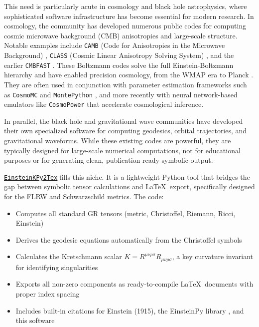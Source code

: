 \documentclass[11pt,a4paper]{article}
\begin{document}
This need is particularly acute in cosmology and black hole astrophysics, where sophisticated software infrastructure has become essential for modern research. In cosmology, the community has developed numerous public codes for computing cosmic microwave background (CMB) anisotropies and large-scale structure. Notable examples include \texttt{CAMB} (Code for Anisotropies in the Microwave Background) \cite{Lewis2000}, \texttt{CLASS} (Cosmic Linear Anisotropy Solving System) \cite{Blas2011, Lesgourgues2011a, Lesgourgues2011b}, and the earlier \texttt{CMBFAST} \cite{Seljak1996}. These Boltzmann codes solve the full Einstein-Boltzmann hierarchy and have enabled precision cosmology, from the WMAP era to Planck \cite{Planck2018}. They are often used in conjunction with parameter estimation frameworks such as \texttt{CosmoMC} \cite{Lewis2002} and \texttt{MontePython} \cite{Audren2013}, and more recently with neural network-based emulators like \texttt{CosmoPower} \cite{SpurioMancini2021} that accelerate cosmological inference.

In parallel, the black hole and gravitational wave communities have developed their own specialized software for computing geodesics, orbital trajectories, and gravitational waveforms. While these existing codes are powerful, they are typically designed for large-scale numerical computations, not for educational purposes or for generating clean, publication-ready symbolic output.

\href{https://github.com/lontelis/Einsteinpy_to_latex}{{\color{cyan}\texttt{EinsteinKPy2Tex}}} fills this niche. It is a lightweight Python tool that bridges the gap between symbolic tensor calculations and \LaTeX\ export, specifically designed for the FLRW and Schwarzschild metrics. The code:
\begin{itemize}
    \item Computes all standard GR tensors (metric, Christoffel, Riemann, Ricci, Einstein)
    \item Derives the geodesic equations automatically from the Christoffel symbols
    \item Calculates the Kretschmann scalar $K = R^{\mu\nu\rho\sigma}R_{\mu\nu\rho\sigma}$, a key curvature invariant for identifying singularities
    \item Exports all non-zero components as ready-to-compile \LaTeX\ documents with proper index spacing
    \item Includes built-in citations for Einstein (1915), the EinsteinPy library \cite{Ribeiro2020}, and this software
\end{itemize}
\end{document}
